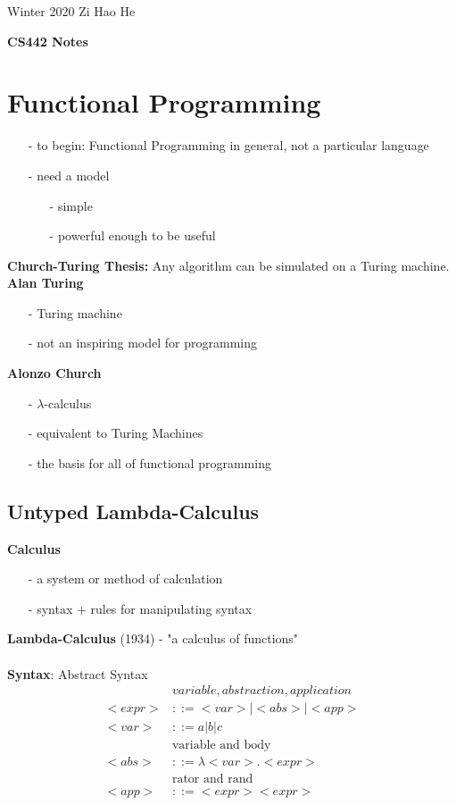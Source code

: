 \documentclass[11pt]{article}
\begin{document}
\noindent
{Winter 2020 \hfill Zi Hao He}


\begin{center}
{\large\bf CS442 Notes}
\end{center}
\bigskip

\section{Functional Programming}

\begin{itemize}
\item[-] to begin: Functional Programming in general, not a particular language
\item[-] need a model \begin{itemize}
\item[-] simple
\item[-] powerful enough to be useful
\end{itemize}
\end{itemize}

\textbf{Church-Turing Thesis:} Any algorithm can be simulated on a Turing machine. \\

\textbf{Alan Turing}
\begin{itemize}
\item[-] Turing machine
\item[-] not an inspiring model for programming
\end{itemize}

\textbf{Alonzo Church}
\begin{itemize}
\item[-] $\lambda$-calculus
\item[-] equivalent to Turing Machines
\item[-] the basis for all of functional programming
\end{itemize}

\subsection{Untyped Lambda-Calculus}

\textbf{Calculus}
\begin{itemize}
\item[-] a system or method of calculation
\item[-] syntax + rules for manipulating syntax
\end{itemize}
\textbf{Lambda-Calculus} (1934) - "a calculus of functions" \\ \\
\textbf{Syntax}: Abstract Syntax
\begin{align*}
& variable, abstraction, application \\
<expr> &::= <var> | <abs> | <app> \\
<var> &::= a | b | c \\
& \text{variable and body} \\
<abs> &::= \lambda <var>.<expr> \\
& \text{rator and rand} \\
<app> &::= <expr> <expr>
\end{align*}
\end{document}
